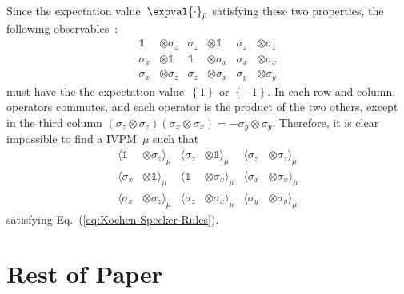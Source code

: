\documentclass[english,reprint, aps, prl,superscriptaddress, showpacs,
showkeys, longbibliography, amsmath, amssymb]{revtex4-1}
\theoremstyle{plain}
\theoremstyle{definition}
\begin{document}
Since the expectation value~$\expval{\cdot}_{\bar{\mu}}$ satisfying
these two properties, the following observables~\cite{Mermin1990Simple,peres1995quantum}:
\begin{equation}
\begin{aligned}\mathbb{1} & \otimes\sigma_{z} & \sigma_{z} & \otimes\mathbb{1} & \sigma_{z} & \otimes\sigma_{z}\\
\sigma_{x} & \otimes\mathbb{1} & \mathbb{1} & \otimes\sigma_{x} & \sigma_{x} & \otimes\sigma_{x}\\
\sigma_{x} & \otimes\sigma_{z} & \sigma_{z} & \otimes\sigma_{x} & \sigma_{y} & \otimes\sigma_{y}
\end{aligned}
\label{eq:MerminSquare}
\end{equation}
must have the the expectation value~$\left\{ 1\right\} $ or $\left\{ -1\right\} $.
In each row and column, operators commutes, and each operator is the
product of the two others, except in the third column $\left(\sigma_{z}\otimes\sigma_{z}\right)\left(\sigma_{x}\otimes\sigma_{x}\right)=-\sigma_{y}\otimes\sigma_{y}$.
Therefore, it is clear impossible to find a IVPM~$\bar{\mu}$ such
that 
\begin{equation}
\begin{aligned}\langle\mathbb{1} & \otimes\sigma_{z}\rangle_{\bar{\mu}} & \langle\sigma_{z} & \otimes\mathbb{1}\rangle_{\bar{\mu}} & \langle\sigma_{z} & \otimes\sigma_{z}\rangle_{\bar{\mu}}\\
\langle\sigma_{x} & \otimes\mathbb{1}\rangle_{\bar{\mu}} & \langle\mathbb{1} & \otimes\sigma_{x}\rangle_{\bar{\mu}} & \langle\sigma_{x} & \otimes\sigma_{x}\rangle_{\bar{\mu}}\\
\langle\sigma_{x} & \otimes\sigma_{z}\rangle_{\bar{\mu}} & \langle\sigma_{z} & \otimes\sigma_{x}\rangle_{\bar{\mu}} & \langle\sigma_{y} & \otimes\sigma_{y}\rangle_{\bar{\mu}}
\end{aligned}
\label{eq:MerminSquare-values}
\end{equation}
satisfying Eq.~(\ref{eq:Kochen-Specker-Rules}).

\newpage  
\section{Rest of Paper}
 
\end{document}
